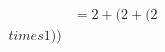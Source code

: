 \documentclass[preview]{standalone}
\begin{document}
\begin{align*}
&= 2 + (2 + (2 \\times 1)) \\
\end{align*}
\end{document}
